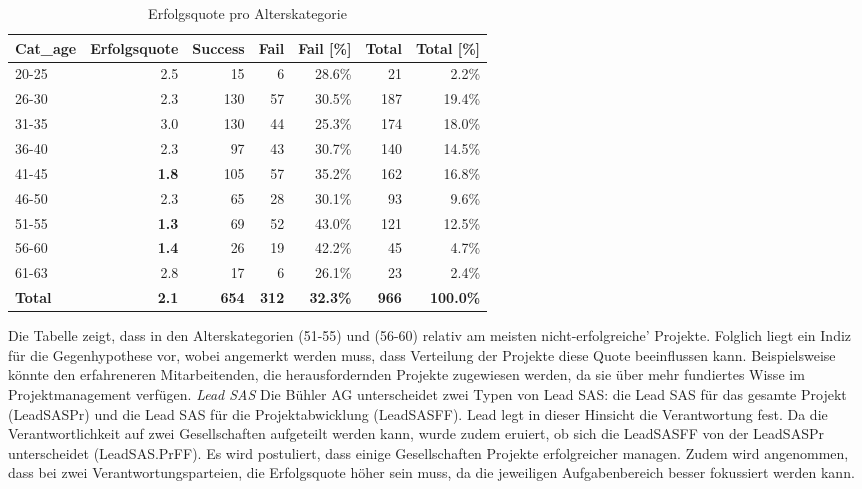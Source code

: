 \begin{table}[htbp]
	\centering
	\caption{Erfolgsquote pro Alterskategorie}
	\begin{tabular}{lrrrrrr}
		\textbf{Cat\_age} & \multicolumn{1}{l}{\textbf{Erfolgsquote}} & \multicolumn{1}{l}{\textbf{Success}} & \multicolumn{1}{l}{\textbf{Fail}} & \multicolumn{1}{l}{\textbf{Fail [\%]}} & \multicolumn{1}{l}{\textbf{Total}} & \multicolumn{1}{l}{\textbf{Total [\%]}} \\\hline
		20-25 & 2.5   & 15    & 6     & 28.6\% & 21    & 2.2\% \\
		26-30 & 2.3   & 130   & 57    & 30.5\% & 187   & 19.4\% \\
		31-35 & 3.0   & 130   & 44    & 25.3\% & 174   & 18.0\% \\
		36-40 & 2.3   & 97    & 43    & 30.7\% & 140   & 14.5\% \\
		41-45 & \textbf{1.8} & 105   & 57    & 35.2\% & 162   & 16.8\% \\
		46-50 & 2.3   & 65    & 28    & 30.1\% & 93    & 9.6\% \\
		51-55 & \textbf{1.3} & 69    & 52    & 43.0\% & 121   & 12.5\% \\
		56-60 & \textbf{1.4} & 26    & 19    & 42.2\% & 45    & 4.7\% \\
		61-63 & 2.8   & 17    & 6     & 26.1\% & 23    & 2.4\% \\\hline
		\textbf{Total} & \textbf{2.1} & \textbf{654} & \textbf{312} & \textbf{32.3\%} & \textbf{966} & \textbf{100.0\%} \\
	\end{tabular}%
	\label{fagecat}%
\end{table}%
Die Tabelle zeigt, dass in den Alterskategorien (51-55) und (56-60) relativ am meisten nicht-erfolgreiche' Projekte. Folglich liegt ein Indiz für die Gegenhypothese vor, wobei angemerkt werden muss, dass Verteilung der Projekte diese Quote beeinflussen kann. Beispielsweise könnte den erfahreneren Mitarbeitenden, die herausfordernden Projekte zugewiesen werden, da sie über mehr fundiertes Wisse im Projektmanagement verfügen.
%
%
\newline\newline\textit{Lead SAS}
Die Bühler AG unterscheidet zwei Typen von Lead SAS: die Lead SAS für das gesamte Projekt (LeadSASPr) und die Lead SAS für die Projektabwicklung (LeadSASFF). Lead legt in dieser Hinsicht die Verantwortung fest. Da die Verantwortlichkeit auf zwei Gesellschaften aufgeteilt werden kann, wurde zudem eruiert, ob sich die LeadSASFF von der LeadSASPr unterscheidet (LeadSAS.PrFF). Es wird postuliert, dass einige Gesellschaften Projekte erfolgreicher managen. Zudem wird angenommen, dass bei zwei Verantwortungsparteien, die Erfolgsquote höher sein muss, da die jeweiligen Aufgabenbereich besser fokussiert werden kann.
